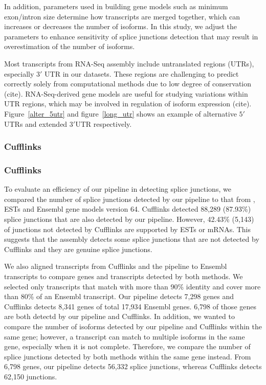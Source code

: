 \documentclass[10pt]{article}
\begin{document}
In addition, parameters used in building gene models such as minimum
exon/intron size determine how transcripts are merged together, which
can increases or decreases the number of isoforms.  In this study, we
adjust the parameters to enhance sensitivity of splice junctions
detection that may result in overestimation of the number of isoforms.

Most transcripts from RNA-Seq assembly include untranslated regions (UTRs),
especially $3'$ UTR in our datasets.
These regions are challenging to predict correctly solely from computational
methods due to low degree of conservation (cite).
RNA-Seq-derived gene models are useful for studying variations within UTR regions,
which may be involved in regulation of isoform expression (cite).
Figure~\ref{alter_5utr} and figure~\ref{long_utr} shows an example of alternative
$5'$UTRs and extended $3'$UTR respectively.

\subsubsection{Cufflinks}

\subsubsection*{Cufflinks}

To evaluate an efficiency of our pipeline in detecting splice junctions,
we compared the number of splice junctions detected by our pipeline to
that from , ESTs and Ensembl gene models version 64.
Cufflinks detected 88,289 (87.93\%) splice junctions that are also detected
by our pipeline.
However, 42.43\% (5,143) of junctions not detected by Cufflinks are supported
by ESTs or mRNAs.
This suggests that the assembly detects some splice junctions that are
not detected by Cufflinks and they are genuine splice junctions.

We also aligned transcripts from Cufflinks and the pipeline to Ensembl
transcripts to compare genes and transcripts detected by both methods.
We selected only transcripts that match with more than 90\% identity and
cover more than 80\% of an Ensembl transcript.
Our pipeline detects 7,298 genes and Cufflinks detects 8,341 genes of
total 17,934 Ensembl genes.
6,798 of those genes are both detectd by our pipeline and Cufflinks.
In addition, we wanted to compare the number of isoforms detected by our
pipeline and Cufflinks within the same gene; however, a transcript can
match to multiple isoforms in the same gene, especially when it is not complete.
Therefore, we compare the number of splice junctions detected by both
methods within the same gene instead.
From 6,798 genes, our pipeline detects 56,332 splice junctions, whereas
Cufflinks detects 62,150 junctions.
\end{document}
